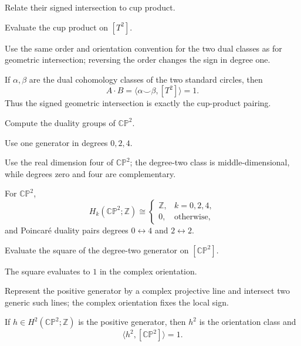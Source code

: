 \begin{exercise}\label{exr:viii33-06}
Relate their signed intersection to cup product.
\end{exercise}
\begin{hint}
Evaluate the cup product on $[T^2]$.

Use the same order and orientation convention for the two dual classes as for geometric intersection; reversing the order changes the sign in degree one.
\end{hint}
\begin{solution}
If \(\alpha,\beta\) are the dual cohomology classes of the two standard circles, then
\[
A\cdot B=\langle\alpha\smile\beta,[T^2]\rangle=1.
\]
Thus the signed geometric intersection is exactly the cup-product pairing.
\end{solution}

\begin{exercise}\label{exr:viii33-07}
Compute the duality groups of $\mathbb{CP}^2$.
\end{exercise}
\begin{hint}
Use one generator in degrees $0,2,4$.

Use the real dimension four of \(\mathbb{CP}^2\); the degree-two class is middle-dimensional, while degrees zero and four are complementary.
\end{hint}
\begin{solution}
For \(\mathbb{CP}^2\),
\[
H_k(\mathbb{CP}^2;\mathbb Z)\cong
\begin{cases}\mathbb Z,&k=0,2,4,\\0,&\text{otherwise},\end{cases}
\]
and Poincaré duality pairs degrees \(0\leftrightarrow4\) and \(2\leftrightarrow2\).
\end{solution}

\begin{exercise}\label{exr:viii33-08}
Evaluate the square of the degree-two generator on $[\mathbb{CP}^2]$.
\end{exercise}
\begin{hint}
The square evaluates to $1$ in the complex orientation.

Represent the positive generator by a complex projective line and intersect two generic such lines; the complex orientation fixes the local sign.
\end{hint}
\begin{solution}
If \(h\in H^2(\mathbb{CP}^2;\mathbb Z)\) is the positive generator, then \(h^2\) is the orientation class and
\[
\langle h^2,[\mathbb{CP}^2]\rangle=1.
\]
\end{solution}

